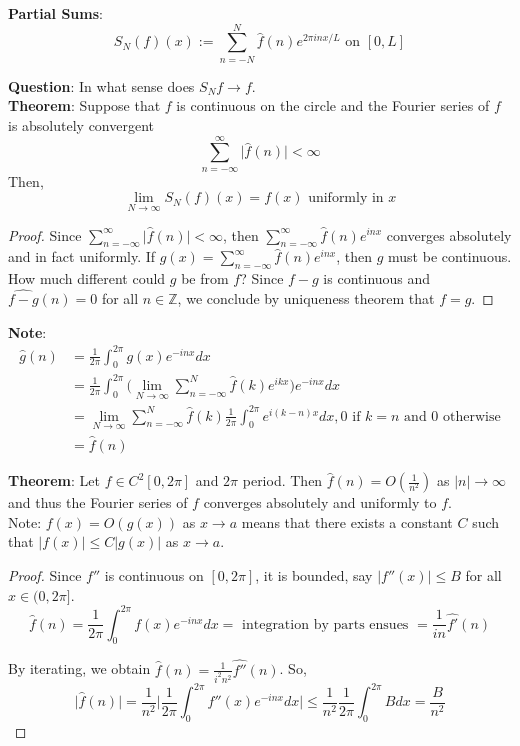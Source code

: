 \documentclass[12pt]{article}
\begin{document}
\noindent \textbf{Partial Sums}: $$S_N(f)(x):= \sum^N_{n=-N}\hat{f}(n) e^{2\pi inx/L} \text{ on } [0,L]$$

\textbf{Question}: In what sense does $S_Nf \rightarrow f$. \\

\noindent \textbf{Theorem}: Suppose that $f$ is continuous on the circle and the Fourier series of $f$ is absolutely convergent
$$\sum^\infty_{n=-\infty} \vert \hat{f}(n)\vert < \infty $$
Then, 
$$\lim_{N\rightarrow \infty} S_N(f)(x)=f(x) \text{ uniformly in } x$$


\begin{proof}
Since $\sum^\infty_{n=-\infty} \vert \hat{f}(n)\vert < \infty $, then $\sum^\infty_{n=-\infty} \hat{f}(n)e^{inx}$ converges absolutely and in fact uniformly. If $g(x) = \sum^{\infty}_{n=-\infty} \hat{f}(n) e^{inx}$, then $g$ must be continuous. How much different could $g$ be from $f$? Since $f-g$ is continuous and $\hat{f-g}(n)=0$ for all $n \in \mathbb{Z}$, we conclude by uniqueness theorem that $f=g$.  
\end{proof}

\noindent \textbf{Note}: 
\begin{align*}\hat{g}(n) &= \frac{1}{2\pi} \int^{2\pi}_0 g(x) e^{-inx} dx \\
&= \frac{1}{2\pi} \int^{2\pi}_0 \Big(\lim_{N\rightarrow \infty} \sum^N_{n=-\infty} \hat{f}(k)e^{ikx}\Big)e^{-inx}dx  \\
&= \lim_{N\rightarrow \infty} \sum^N_{n=-\infty} \hat{f}(k) \frac{1}{2\pi} \int^{2\pi}_0 e^{i(k-n)x}dx, 0 \text{ if } k=n \text{ and } 0 \text{ otherwise} \\
&= \hat{f}(n)
\end{align*}

\noindent \textbf{Theorem}:  Let $f \in C^2[0,2\pi]$ and $2\pi$ period. Then $\hat{f}(n) = O(\frac{1}{n^2})$ as $\vert n \vert \rightarrow \infty$ and thus the Fourier series of $f$ converges absolutely and uniformly to $f$. \\

\noindent Note: $f(x) = O(g(x))$ as $x \rightarrow a$ means that there exists a constant $C$ such that $\vert f(x) \vert \leq C \vert g(x)\vert$ as $x \rightarrow a$. 

\begin{proof}
Since $f''$ is continuous on $[0,2\pi]$, it is bounded, say $\vert f''(x) \vert \leq B$ for all $x \in (0, 2\pi]$. 
$$\hat{f}(n) = \frac{1}{2\pi} \int^{2\pi}_0 f(x)e^{-inx} dx = \text{ integration by parts ensues } = \frac{1}{in} \hat{f'}(n)$$

\noindent By iterating, we obtain $\hat{f}(n) = \frac{1}{i^2n^2} \hat{f''}(n)$. So,
$$\vert \hat{f}(n) \vert = \frac{1}{n^2} \vert \frac{1}{2\pi} \int^{2\pi}_0 f''(x)e^{-inx} dx \vert  \leq \frac{1}{n^2} \frac{1}{2\pi} \int^{2\pi}_0 B dx = \frac{B}{n^2}$$
\end{proof}
\end{document}
